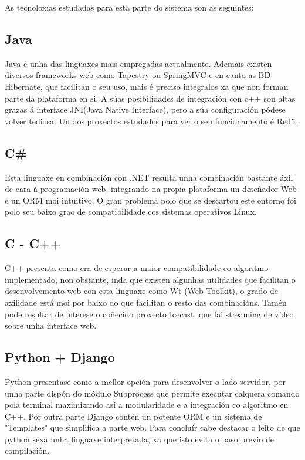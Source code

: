 	As tecnoloxías estudadas para esta parte do sistema son as seguintes:

	\subsection{Java}
  	Java é unha das linguaxes mais empregadas actualmente. Ademais existen diversos
  	frameworks web como Tapestry ou SpringMVC e en canto as BD Hibernate, que facilitan o 
  	seu uso, mais é preciso integralos xa que non forman parte da plataforma en si. A súas 
  	posibilidades de integración con c++ son altas grazas á interface JNI(Java Native 
  	Interface), pero a súa configuración pódese volver tediosa. Un dos proxectos estudados
  	para ver o seu funcionamento é Red5 \cite{red5-github-url}.
  	
	\subsection{C\#}
	Esta linguaxe en combinación con .NET resulta unha combinación bastante áxil de cara
	á programación web, integrando na propia plataforma un deseñador Web e un ORM moi 
	intuitivo. O gran problema polo que se descartou este entorno foi polo seu baixo grao
	de compatibilidade cos sistemas operativos Linux.
	
	\subsection{C - C++}
	C++ presenta como era de esperar a maior compatibilidade co algoritmo implementado, non
	obstante, inda que existen algunhas utilidades que facilitan o desenvolvemento web con 
	esta linguaxe como Wt (Web Toolkit)\cite{wt-url}, o grado de axilidade está moi por 
	baixo do que facilitan o resto das combinacións. Tamén pode resultar de interese o
	coñecido proxecto Icecast\cite{icecast-url}, que fai streaming de vídeo sobre unha 
	interface web.
	
	\subsection{Python + Django}
	Python presentase como a mellor opción para desenvolver o lado servidor, por unha parte
	dispón do módulo Subprocess\cite{subprocess-module-url} que permite executar calquera
	comando pola terminal maximizando así a modularidade e a integración co algoritmo en C++.
	Por outra parte Django\cite{django-web-page-url} contén un potente ORM e un sistema de 
	"Templates" que simplifica a parte web. Para concluír cabe destacar o feito de que 
	python sexa unha linguaxe interpretada, xa que isto evita o paso previo de compilación.
	
